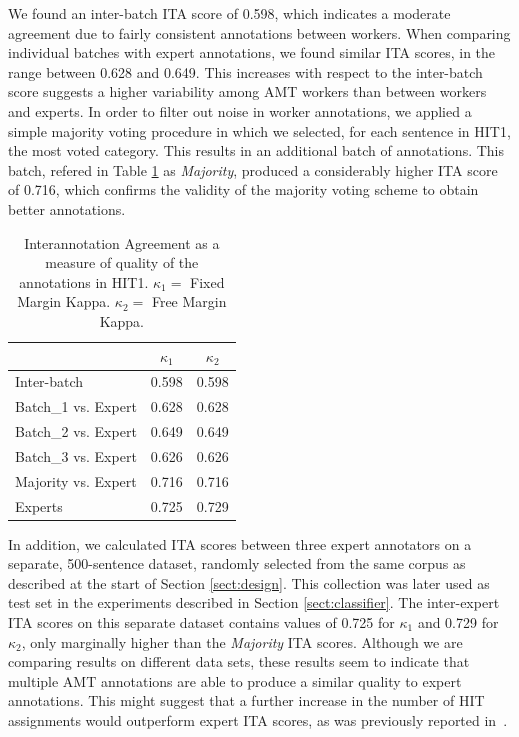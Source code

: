 \documentclass[11pt]{elsarticle}
\begin{document}
We found an inter-batch ITA score of 0.598, which indicates a moderate agreement due to fairly consistent annotations between workers. When comparing individual batches with expert annotations, we found similar ITA scores, in the range between 0.628 and 0.649. This increases with respect to the inter-batch score suggests a higher variability among AMT workers than between workers and experts.
In order to filter out noise in worker annotations, we applied a simple majority voting procedure in which we selected, for each sentence in HIT1, the most voted category. This results in an additional batch of annotations. This batch, refered in Table \ref{tablita} as \textit{Majority}, produced a considerably higher ITA score of 0.716, which confirms the validity of the majority voting scheme to obtain better annotations.

\begin{table}[h]
\begin{center}
\begin{tabular}{|l|c|c|}
\hline
& $\kappa_{1}$ & $\kappa_{2}$ \\
\hline
Inter-batch & 0.598 & 0.598 \\ \hline
Batch\_1 vs. Expert & 0.628 & 0.628\\
Batch\_2 vs. Expert & 0.649 & 0.649\\
Batch\_3 vs. Expert & 0.626 & 0.626\\ \hline
Majority vs. Expert & 0.716 & 0.716\\ \hline
Experts& 0.725 & 0.729\\ \hline
\end{tabular}
\end{center}
\caption{Interannotation Agreement as a measure of quality of the annotations in HIT1. $\kappa_{1} = $ Fixed Margin Kappa. $\kappa_{2} = $ Free Margin Kappa.}
\label{tablita}
\end{table}


In addition, we calculated ITA scores between three expert annotators on a separate, 500-sentence dataset, randomly selected from the same corpus as described at the start of Section \ref{sect:design}. This collection was later used as test set in the experiments described in Section \ref{sect:classifier}. The inter-expert ITA scores on this separate dataset contains values of 0.725 for $\kappa_{1}$ and 0.729 for $\kappa_{2}$, only marginally higher than the \textit{Majority} ITA scores. Although we are comparing results on different data sets, these results seem to indicate that multiple AMT annotations are able to produce a similar quality to expert annotations. This might suggest that a further increase in the number of HIT assignments would outperform expert ITA scores, as was previously reported in~\cite{snow_cheap_2008}.
\end{document}
